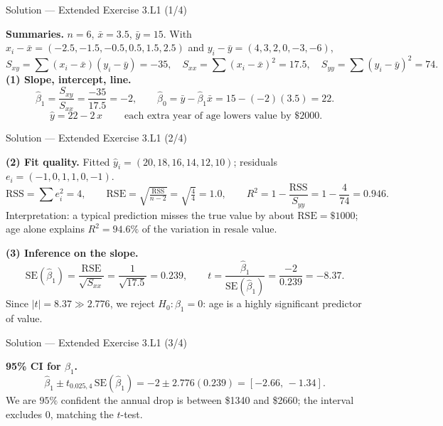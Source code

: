 \documentclass[aspectratio=169,11pt]{beamer}
\begin{document}
\begin{frame}{Solution --- Extended Exercise 3.L1 (1/4)}
  \begin{solutionbox}
    \textbf{Summaries.} $n=6$, $\bar x=3.5$, $\bar y=15$. With
    $x_i-\bar x=(-2.5,-1.5,-0.5,0.5,1.5,2.5)$ and
    $y_i-\bar y=(4,3,2,0,-3,-6)$,
    \[
      S_{xy}=\sum(x_i-\bar x)(y_i-\bar y)=-35,\quad
      S_{xx}=\sum(x_i-\bar x)^2=17.5,\quad
      S_{yy}=\sum(y_i-\bar y)^2=74.
    \]
    \textbf{(1) Slope, intercept, line.}
    \[
      \hat\beta_1=\frac{S_{xy}}{S_{xx}}=\frac{-35}{17.5}=-2,\qquad
      \hat\beta_0=\bar y-\hat\beta_1\bar x=15-(-2)(3.5)=22.
    \]
    \[
      \boxed{\ \hat y = 22 - 2\,x\ }\qquad
      \text{each extra year of age lowers value by }\$2000.
    \]
  \end{solutionbox}
\end{frame}

\begin{frame}{Solution --- Extended Exercise 3.L1 (2/4)}
  \begin{solutionbox}
    \textbf{(2) Fit quality.} Fitted $\hat y_i=(20,18,16,14,12,10)$;
    residuals $e_i=(-1,0,1,1,0,-1)$.
    \[
      \mathrm{RSS}=\sum e_i^2=4,\qquad
      \mathrm{RSE}=\sqrt{\tfrac{\mathrm{RSS}}{n-2}}=\sqrt{\tfrac{4}{4}}=1.0,\qquad
      R^2=1-\frac{\mathrm{RSS}}{S_{yy}}=1-\frac{4}{74}=0.946.
    \]
    Interpretation: a typical prediction misses the true value by about
    $\mathrm{RSE}=\$1000$; age alone explains $R^2=94.6\%$ of the
    variation in resale value.

    \textbf{(3) Inference on the slope.}
    \[
      \mathrm{SE}(\hat\beta_1)=\frac{\mathrm{RSE}}{\sqrt{S_{xx}}}
      =\frac{1}{\sqrt{17.5}}=0.239,\qquad
      t=\frac{\hat\beta_1}{\mathrm{SE}(\hat\beta_1)}=\frac{-2}{0.239}=-8.37.
    \]
    Since $|t|=8.37\gg 2.776$, we reject $H_0:\beta_1=0$: age is a highly
    significant predictor of value.
  \end{solutionbox}
\end{frame}

\begin{frame}{Solution --- Extended Exercise 3.L1 (3/4)}
  \begin{solutionbox}
    \textbf{95\% CI for $\beta_1$.}
    \[
      \hat\beta_1\pm t_{0.025,4}\,\mathrm{SE}(\hat\beta_1)
      =-2\pm 2.776(0.239)=[-2.66,\,-1.34].
    \]
    We are $95\%$ confident the annual drop is between \$1340 and \$2660;
    the interval excludes $0$, matching the $t$-test.
  \end{solutionbox}
\end{frame}
\end{document}
